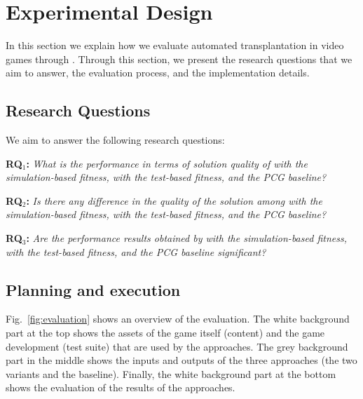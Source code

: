 \section{Experimental Design} 
\label{sec:Evaluation}

In this section we explain how we evaluate automated transplantation in video games through \ApproachName{}. Through this section, we present the research questions that we aim to answer, the evaluation process, and the implementation details.

\subsection{Research Questions}

We aim to answer the following research questions:

\textbf{RQ$_1$: }\textit{What is the performance in terms of solution quality of \ApproachName{} with the simulation-based fitness, \ApproachName{} with the test-based fitness, and the PCG baseline?}

\textbf{RQ$_2$: }\textit{Is there any difference in the quality of the solution among \ApproachName{} with the simulation-based fitness, \ApproachName{} with the test-based fitness, and the PCG baseline?}

\textbf{RQ$_3$: }\textit{Are the performance results obtained by \ApproachName{} with the simulation-based fitness, \ApproachName{} with the test-based fitness, and the PCG baseline significant?}


\subsection{Planning and execution}

Fig.~\ref{fig:evaluation} shows an overview of the evaluation. The white background part at the top shows the assets of the game itself (content) and the game development (test suite) that are used by the approaches. The grey background part in the middle shows the inputs and outputs of the three approaches (the two \ApproachName{} variants and the baseline). Finally, the white background part at the bottom shows the evaluation of the results of the approaches.

